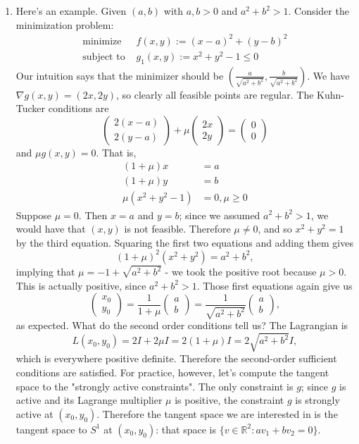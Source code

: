 \documentclass[11pt]{book}
\newcommand{\R}{\mathbb{R}}
\begin{document}
\begin{enumerate}
\item
Here's an example. Given $(a,b)$ with $a,b > 0$ and $a^2+b^2 > 1$. Consider the minimization problem:
\begin{align*}
\text{minimize } &f(x,y) := (x-a)^2 + (y-b)^2 \\
\text{subject to } &g_1(x,y) := x^2+y^2-1 \leq 0
\end{align*}
Our intuition says that the minimizer should be $\left( \frac{a}{\sqrt{a^2+b^2}}, \frac{b}{\sqrt{a^2+b^2}} \right)$. We have $\nabla g(x,y) = (2x, 2y)$, so clearly all feasible points are regular. The Kuhn-Tucker conditions are
\[
\begin{pmatrix}
2(x-a) \\ 2(y-a)
\end{pmatrix} + \mu \begin{pmatrix}
2x \\ 2y
\end{pmatrix} = \begin{pmatrix}
0 \\ 0
\end{pmatrix}
\]
and $\mu g(x,y) = 0$. That is,
\begin{align*}
(1+\mu)x &= a \\
(1+\mu)y &= b \\
\mu (x^2+y^2 - 1) &= 0, \mu \geq 0
\end{align*}
Suppose $\mu = 0$. Then $x = a$ and $y = b$; since we assumed $a^2+b^2 > 1$, we would have that $(x,y)$ is not feasible. Therefore $\mu \neq 0$, and so $x^2+y^2 = 1$ by the third equation. Squaring the first two equations and adding them gives
\[
(1+\mu)^2 (x^2+y^2) = a^2+b^2,
\]
implying that $\mu = -1 + \sqrt{a^2+b^2}$ - we took the positive root because $\mu > 0$. This is actually positive, since $a^2+b^2 > 1$. Those first equations again give us
\[
\begin{pmatrix}
x_0 \\ y_0
\end{pmatrix} = \frac{1}{1+\mu} \begin{pmatrix}
a \\ b
\end{pmatrix} = \frac{1}{\sqrt{a^2+b^2}} \begin{pmatrix}
a \\ b
\end{pmatrix},
\]
as expected. What do the second order conditions tell us? The Lagrangian is
\[
L(x_0, y_0) = 2I + 2\mu I = 2(1+\mu)I = 2\sqrt{a^2+b^2} I,
\]
which is everywhere positive definite. Therefore the second-order sufficient conditions are satisfied. For practice, however, let's compute the tangent space to the "strongly active constraints". The only constraint is $g$; since $g$ is active and its Lagrange multiplier $\mu$ is positive, the constraint $g$ is strongly active at $(x_0, y_0)$. Therefore the tangent space we are interested in is the tangent space to $S^1$ at $(x_0, y_0)$: that space is $\{v \in \R^2 : av_1 + bv_2 = 0\}$.


\end{enumerate}
\end{document}
